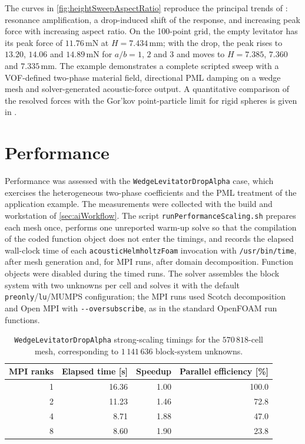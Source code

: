 \documentclass[final,12pt,nopreprintline]{elsarticle}
\newcommand{\code}[1]{\texttt{#1}}
\begin{document}
The curves in \cref{fig:heightSweepAspectRatio} reproduce the principal trends
of \cite{andrade2019numerical}: resonance amplification, a drop-induced shift
of the response, and increasing peak force with increasing aspect ratio.  On
the 100-point grid, the empty levitator has its peak force of
$11.76\,\mathrm{mN}$ at $H=7.434\,\mathrm{mm}$; with the drop, the peak rises
to $13.20$, $14.06$ and $14.89\,\mathrm{mN}$ for $a/b=1$, $2$ and $3$ and moves
to $H=7.385$, $7.360$ and $7.335\,\mathrm{mm}$.  The
example demonstrates a complete scripted sweep with a VOF-defined two-phase
material field, directional PML damping on a wedge mesh and solver-generated
acoustic-force output.  A quantitative comparison of the resolved forces with
the Gor'kov point-particle limit for rigid spheres is given in
\cite{Xu2026HelmholtzPML}.

\FloatBarrier
\section{Performance}
\label{sec:performance}

Performance was assessed with the \code{WedgeLevitatorDropAlpha} case, which
exercises the heterogeneous two-phase coefficients and the PML treatment of
the application example.  The measurements were collected with the build and
workstation of \cref{sec:aiWorkflow}.  The script \code{runPerformanceScaling.sh}
prepares each mesh once, performs one unreported warm-up solve so that the
compilation of the coded function object does not enter the timings, and
records the elapsed wall-clock time of each \code{acousticHelmholtzFoam}
invocation with \code{/usr/bin/time}, after mesh generation and, for MPI
runs, after domain decomposition.  Function objects were disabled during the
timed runs.  The solver assembles the block system with two unknowns per
cell and solves it with the default \code{preonly}/\code{lu}/MUMPS
configuration; the MPI runs used Scotch decomposition and Open MPI with
\code{-{}-oversubscribe}, as in the standard OpenFOAM run functions.

\begin{table}[H]
    \centering
    \caption{\code{WedgeLevitatorDropAlpha} strong-scaling timings for the
    $570\,818$-cell mesh, corresponding to $1\,141\,636$ block-system
    unknowns.}
    \label{tab:dropAlphaStrongScaling}
    \begin{tabular}{rrrr}
        \toprule
        MPI ranks & Elapsed time [s] & Speedup & Parallel efficiency [\%] \\
        \midrule
        1 & 16.36 & 1.00 & 100.0 \\
        2 & 11.23 & 1.46 & 72.8 \\
        4 & 8.71 & 1.88 & 47.0 \\
        8 & 8.60 & 1.90 & 23.8 \\
        \bottomrule
    \end{tabular}
\end{table}
\end{document}
